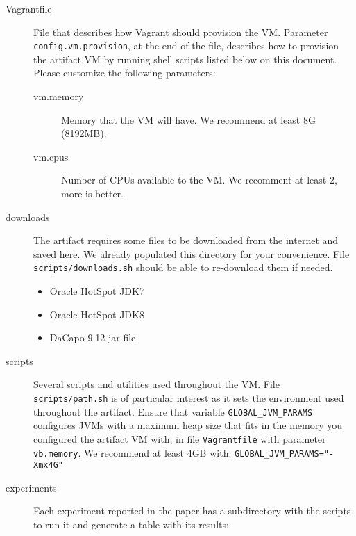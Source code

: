 \documentclass[12pt]{article}
\newcommand{\host}[1]{\colorbox{blue!20}{\texttt{\color{black}#1}}}
\begin{document}
\begin{description}

    \item[Vagrantfile] File that describes how Vagrant should provision the VM.
        Parameter \texttt{config.vm.provision}, at the end of the file,
        describes how to provision the artifact VM by running shell scripts
        listed below on this document.  Please customize the following
        parameters:

        \begin{description}

            \item[vm.memory] Memory that the VM will have.  We recommend at least 8G (8192MB).

            \item[vm.cpus] Number of CPUs available to the VM.  We recomment at least 2, more is better.

        \end{description}

    \item[downloads] The artifact requires some files to be downloaded from the
        internet and saved here.  We already populated this directory for your
        convenience.  File \host{scripts/downloads.sh} should be able to
        re-download them if needed.

        \begin{itemize}

            \item Oracle HotSpot JDK7

            \item Oracle HotSpot JDK8

            \item DaCapo 9.12 jar file

        \end{itemize}

    \item[scripts]  Several scripts and utilities used throughout the VM.  File
        \host{scripts/path.sh} is of particular interest as it sets the
        environment used throughout the artifact.  Ensure that variable
        \texttt{GLOBAL\_JVM\_PARAMS} configures JVMs with a maximum heap size
        that fits in the memory you configured the artifact VM with, in file
        \host{Vagrantfile} with parameter \texttt{vb.memory}.  We recommend at
        least 4GB with: \texttt{GLOBAL\_JVM\_PARAMS="-Xmx4G"}

    \item[experiments]  Each experiment reported in the paper has a
        subdirectory with the scripts to run it and generate a table with its
        results:


\end{description}
\end{document}
